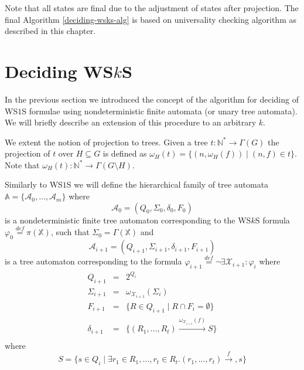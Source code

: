 Note that all states are final due to the adjustment of states after projection.
The final Algorithm \ref{deciding-wsks-alg} is based on universality checking
algorithm as described in this chapter.

%    

\section{Deciding WS$k$S}

In the previous section we introduced the concept of the algorithm for deciding
of WS$1$S formulae using nondeterministic finite automata (or unary tree
automata).
We will briefly describe an extension of this procedure to an arbitrary $k$.

We extent the notion of projection to trees. Given a tree $t :
\mathbb{N}^* \rightarrow \Gamma(G)$ the projection of $t$ over $H \subseteq G$
is defined as $\omega_H(t) = \{(n, \omega_H(f)) \mid (n, f) \in t\}$. Note that
$\omega_H(t) : \mathbb{N}^* \rightarrow \Gamma(G\setminus H)$.

Similarly to WS$1$S we will define the hierarchical family of tree automata
$\mathbb{A} = \{\mathcal{A}_0,\ldots,\mathcal{A}_m\}$ where
\begin{equation}
 \mathcal{A}_0 = (Q_0, \Sigma_0, \delta_0, F_0)
\end{equation} is a nondeterministic finite tree automaton corresponding to the
WS$k$S formula $\varphi_0 \overset{\mathit{def}}{=} \pi(\mathbb{X})$, such that
$\Sigma_0 = \Gamma(\mathbb{X})$ and
\begin{equation}
 \mathcal{A}_{i+1} = (Q_{i+1}, \Sigma_{i+1}, \delta_{i+1}, F_{i+1})
\end{equation}
is a tree automaton corresponding to the formula $\varphi_{i+1}
\overset{\mathit{def}}{=} \neg\exists\mathcal{X}_{i+1}: \varphi_i$ where
\begin{eqnarray}
 Q_{i+1} & = & 2^{Q_i}\\
 \Sigma_{i+1} & = & \omega_{\mathcal{X}_{i+1}}(\Sigma_i)\\
 F_{i+1} & = & \{R \in Q_{i+1} \mid R \cap F_i = \emptyset\}\\
 \delta_{i+1} & = & \{(R_1,\ldots,R_t)
 \overset{\omega_{\mathcal{X}_{i+1}}(f)}{\longrightarrow} S\}\\
\end{eqnarray}
where
\begin{equation}
S = \{s \in Q_i \mid \exists r_1 \in R_1,\ldots,r_t \in R_t.
 (r_1,\ldots,r_t) \overset{f}{\longrightarrow}, s\}
\end{equation}

